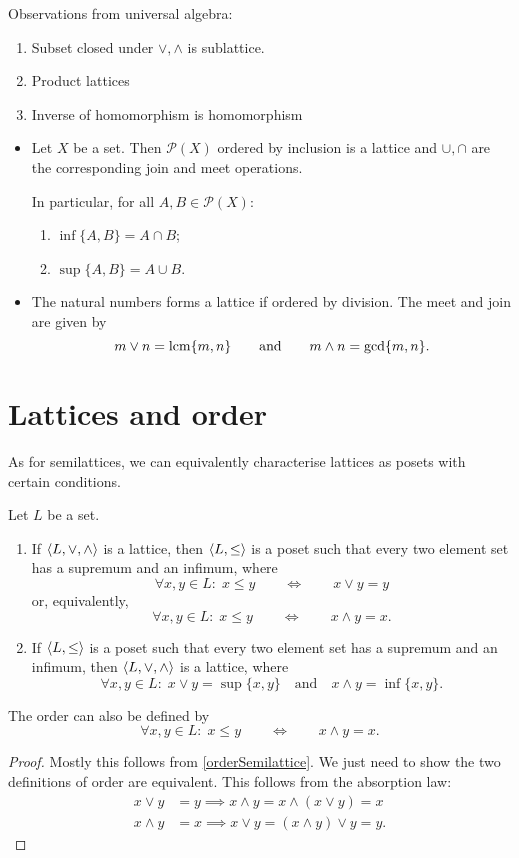 \begin{proposition}
Observations from universal algebra:
\begin{enumerate}
\item Subset closed under $\vee,\wedge$ is sublattice.
\item Product lattices
\item Inverse of homomorphism is homomorphism
\end{enumerate}
\end{proposition}

\begin{example}
\begin{itemize}
\item Let $X$ be a set. Then $\mathcal{P}(X)$ ordered by inclusion is a lattice and $\cup, \cap$ are the corresponding join and meet operations.

In particular, for all $A,B\in \mathcal{P}(X)$:
\begin{enumerate}
\item $\inf\{A,B\} = A\cap B$;
\item $\sup\{A,B\} = A\cup B$.
\end{enumerate}
\item The natural numbers forms a lattice if ordered by division. The meet and join are given by
\[ m\vee n = \operatorname{lcm}\{m,n\} \qquad \text{and}\qquad m\wedge n = \gcd\{m,n\}. \]
\end{itemize}
\end{example}

\section{Lattices and order}
As for semilattices, we can equivalently characterise lattices as posets with certain conditions.
\begin{proposition}
Let $L$ be a set.
\begin{enumerate}
\item If $\left\langle L,\vee, \wedge \right\rangle$ is a lattice, then $\left\langle L,\leq \right\rangle$ is a poset such that every two element set has a supremum and an infimum, where
\[ \forall x,y\in L:\; x\leq y \qquad \iff \qquad x\vee y = y \]
or, equivalently,
\[ \forall x,y\in L:\; x\leq y \qquad \iff \qquad x\wedge y = x. \]
\item If $\left\langle L,\leq \right\rangle$ is a poset such that every two element set has a supremum and an infimum, then $\left\langle L,\vee, \wedge \right\rangle$ is a lattice, where
\[ \forall x,y\in L: \; x\vee y = \sup\{x,y\} \quad \text{and} \quad x\wedge y = \inf\{x,y\}. \]
\end{enumerate}
The order can also be defined by
\[ \forall x,y\in L:\; x\leq y \qquad \iff \qquad x\wedge y = x. \]
\end{proposition}
\begin{proof}
Mostly this follows from \ref{orderSemilattice}. We just need to show the two definitions of order are equivalent. This follows from the absorption law:
\begin{align*}
x\vee y &= y \implies x\wedge y = x\wedge (x\vee y) = x \\
x\wedge y &= x \implies x\vee y = (x\wedge y) \vee y = y.
\end{align*}
\end{proof}

